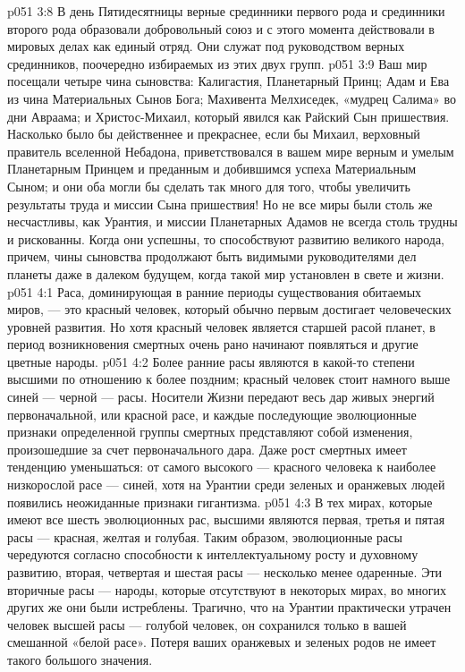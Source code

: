 \vs p051 3:8 В день Пятидесятницы верные срединники первого рода и срединники второго рода образовали добровольный союз и с этого момента действовали в мировых делах как единый отряд. Они служат под руководством верных срединников, поочередно избираемых из этих двух групп.
\vs p051 3:9 \pc Ваш мир посещали четыре чина сыновства: Калигастия, Планетарный Принц; Адам и Ева из чина Материальных Сынов Бога; Махивента Мелхиседек, «мудрец Салима» во дни Авраама; и Христос\hyp{}Михаил, который явился как Райский Сын пришествия. Насколько было бы действеннее и прекраснее, если бы Михаил, верховный правитель вселенной Небадона, приветствовался в вашем мире верным и умелым Планетарным Принцем и преданным и добившимся успеха Материальным Сыном; и они оба могли бы сделать так много для того, чтобы увеличить результаты труда и миссии Сына пришествия! Но не все миры были столь же несчастливы, как Урантия, и миссии Планетарных Адамов не всегда столь трудны и рискованны. Когда они успешны, то способствуют развитию великого народа, причем, чины сыновства продолжают быть видимыми руководителями дел планеты даже в далеком будущем, когда такой мир установлен в свете и жизни.
\vs p051 4:1 Раса, доминирующая в ранние периоды существования обитаемых миров, --- это красный человек, который обычно первым достигает человеческих уровней развития. Но хотя красный человек является старшей расой планет, в период возникновения смертных очень рано начинают появляться и другие цветные народы.
\vs p051 4:2 Более ранние расы являются в какой\hyp{}то степени высшими по отношению к более поздним; красный человек стоит намного выше синей --- черной --- расы. Носители Жизни передают весь дар живых энергий первоначальной, или красной расе, и каждые последующие эволюционные признаки определенной группы смертных представляют собой изменения, произошедшие за счет первоначального дара. Даже рост смертных имеет тенденцию уменьшаться: от самого высокого --- красного человека к наиболее низкорослой расе --- синей, хотя на Урантии среди зеленых и оранжевых людей появились неожиданные признаки гигантизма.
\vs p051 4:3 В тех мирах, которые имеют все шесть эволюционных рас, высшими являются первая, третья и пятая расы --- красная, желтая и голубая. Таким образом, эволюционные расы чередуются согласно способности к интеллектуальному росту и духовному развитию, вторая, четвертая и шестая расы --- несколько менее одаренные. Эти вторичные расы --- народы, которые отсутствуют в некоторых мирах, во многих других же они были истреблены. Трагично, что на Урантии практически утрачен человек высшей расы --- голубой человек, он сохранился только в вашей смешанной «белой расе». Потеря ваших оранжевых и зеленых родов не имеет такого большого значения.
